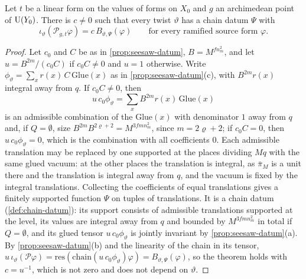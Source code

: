 \begin{theorem}\label{thm:seesaw}
Let $t$ be a linear form on the values of forms on $X_0$ and $g$ an archimedean point of $\operatorname{U}(Y_0)$. There is $c\ne0$ such that
every twist $\vartheta$ has a chain datum $\Psi$ with
\[
  \iota_\vartheta(\mathcal P_{g,t}\varphi)=c\,B_{\vartheta,\Psi}(\varphi)\qquad\text{for every ramified source form }\varphi .
\]
\end{theorem}

\begin{proof}
Let $c_0$ and $C$ be as in \cref{prop:seesaw-datum}, $B=M^{fn_m^2}$, and let $u=B^{2m}/(c_0C)$ if $c_0C\ne0$ and $u=1$ otherwise. Write
$\phi_\vartheta=\sum_xr(x)\,C\,\mathrm{Glue}(x)$ as in \cref{prop:seesaw-datum}(c), with $B^{2m}r(x)$ integral away from $q$. If $c_0C\ne0$, then
\[
  u\,c_0\phi_\vartheta=\sum_xB^{2m}r(x)\,\mathrm{Glue}(x)
\]
is an admissible combination of the $\mathrm{Glue}(x)$ with denominator $1$ away from $q$ and, if $Q=\emptyset$, size $B^{2m}B^{2\varrho+2}=M^{3fmn_m^2}$, since $m=2\varrho+2$; if $c_0C=0$, then $u\,c_0\phi_\vartheta=0$, which is the combination with all coefficients $0$. Each admissible translation may be replaced by one supported at the places
dividing $Mq$ with the same glued vacuum: at the other places the translation is integral, as $\bar\pi_M$ is a unit there and the translation is integral away from $q$, and the vacuum is fixed by the integral translations. Collecting the coefficients of equal translations gives a finitely supported function $\Psi$ on tuples of translations. It is
a chain datum (\cref{def:chain-datum}): its support consists of admissible translations supported at the level, its values are integral away from $q$ and bounded by $M^{3fmn_m^2}$ in total if $Q=\emptyset$, and its glued tensor $u\,c_0\phi_\vartheta$ is jointly invariant by \cref{prop:seesaw-datum}(a). By \cref{prop:seesaw-datum}(b) and the
linearity of the chain in its tensor, $u\,\iota_\vartheta(\mathcal P\varphi)=\mathrm{res}(\mathrm{chain}(u\,c_0\phi_\vartheta)\varphi)=B_{\vartheta,\Psi}(\varphi)$, so the theorem holds with $c=u^{-1}$, which is not zero and does not depend on $\vartheta$.
\end{proof}
